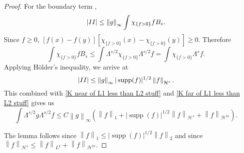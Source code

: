 \documentclass[11pt]{amsart}
\theoremstyle{remark}
\theoremstyle{definition}
\newcommand{\norm}[1]{\left\lVert#1\right\rVert}
\newcommand{\paren}[1]{\left( #1 \right)}
\newcommand{\abs}[1]{\left\lvert #1 \right\rvert}
\DeclareMathOperator{\supp}{supp}
\newcommand{\indic}[1]{\chi_{\{#1\}}}
\newcommand{\HD}{\mathcal{H}}
\newcommand{\Rom}[1]{\MakeUppercase{\romannumeral #1}}
\begin{document}
\begin{proof}
For the boundary term \Rom{2}, 
\[ \abs{\Rom{2}} \leq \norm{g}_\infty \int\indic{f>0} f B_s. \]
Since $f \geq 0$, $[f(x)-f(y)][\indic{f > 0}(x) - \indic{f > 0}(y)] \geq 0$.  Therefore
\[ \int \indic{f > 0} f B_s \leq \int \Lambda^{s/2} \indic{f>0} \Lambda^{s/2} f = \int \indic{f>0} \Lambda^{s} f. \]
Applying H\"{o}lder's inequality, we arrive at
\[ \abs{\Rom{2}} \leq \norm{g}_\infty |\supp(f)|^{1/2} \norm{f}_{\HD^{s}}. \]
This combined with \eqref{K near of L1 less than L2 stuff} and \eqref{K far of L1 less than L2 stuff} gives us 
\[ \int \Lambda^{s/2} g \Lambda^{s/2} f \leq C \norm{g}_\infty \paren{\norm{f}_1 + |\supp(f)|^{1/2} \norm{f}_{\HD^s} + \norm{f}_{\HD^{2s}}}. \]

The lemma follows since $\norm{f}_1 \leq |\supp(f)|^{1/2} \norm{f}_2$ and since $\norm{f}_{\HD^s} \leq \norm{f}_{L^2} + \norm{f}_{\HD^{2s}}$.  

\end{proof}
\end{document}
